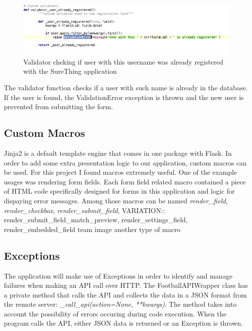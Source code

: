\begin{figure}[H]
	\begin{center}
		\includegraphics[width=.90\linewidth,natwidth=610,natheight=642]{impl/images/customValidator}
		\caption{Validator cheking if user with this username was already registered with the SureThing application} \label{fig:using:customValidator}
	\end{center}
\end{figure}

The validator function checks if a user with such name is already in the database. If the user is found, the ValidationError exception is thrown and the new user is prevented from submitting the form.

\subsection{Custom Macros}
Jinja2 is a default template engine that comes in one package with Flask. In order to add some extra presentation logic to our application, custom macros can be used. For this project I found macros extremely useful. One of the example usages was rendering form fields. Each form field related macro contained a piece of HTML code specifically designed for forms in this application and logic for dispaying error messages. Among those macros can be named \emph{render\_field}, \emph{render\_checkbox}, \emph{render\_submit\_field}, VARIATION:: render\_submit\_field\_match\_preview, render\_settings\_field, render\_embedded\_field
team image another type of macro

\subsection{Exceptions}
The application will make use of Exceptions in order to identify and manage failures when making an API call over HTTP. The FootballAPIWrapper class has a private method that calls the API and collects the data in a JSON format from the remote server: \emph{\_call\_api(action=None, **kwargs)}. The method takes into account the possibility of errors occuring during code execution. When the program calls the API, either JSON data is returned or an Exception is thrown. 

